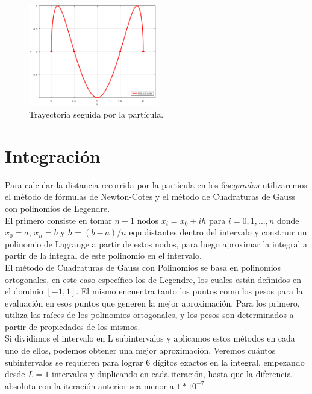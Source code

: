 \documentclass{article}
\begin{document}
    \begin{figure}[h]
        \centering
        \includegraphics[width=0.5\textwidth]{fig3}
        \caption{Trayectoria seguida por la partícula.}
        \label{fig2}
    \end{figure}
    
    \section{Integración}
    Para calcular la distancia recorrida por la partícula en los \(6 segundos\) utilizaremos el método de fórmulas de Newton-Cotes y el método de Cuadraturas de Gauss con polinomios de Legendre.\\
    \indent El primero consiste en tomar \(n+1\) nodos \(x_i=x_0+ih\) para \(i=0,1,...,n\) donde \(x_0=a\), \(x_n=b\) y \(h=(b-a)/n\) equidistantes dentro del intervalo y construir un polinomio de Lagrange a partir de estos nodos, para luego aproximar la integral a partir de la integral de este polinomio en el intervalo.\\
    \indent El método de Cuadraturas de Gauss con Polinomios se basa en polinomios ortogonales, en este caso específico los de Legendre, los cuales están definidos en el dominio \([-1,1]\). El mismo encuentra tanto los puntos como los pesos para la evaluación en esos puntos que generen la mejor aproximación. Para los primero, utiliza las raíces de los polinomios ortogonales, y los pesos son determinados a partir de propiedades de los mismos.\\
    \indent Si dividimos el intervalo en L subintervalos y aplicamos estos métodos en cada uno de ellos, podemos obtener una mejor aproximación. Veremos cuántos subintervalos se requieren para lograr 6 dígitos exactos en la integral, empezando desde \(L=1\) intervalos y duplicando en cada iteración, hasta que la diferencia absoluta con la iteración anterior sea menor a \(1*10^{-7}\)\\\\\\\\
\end{document}
